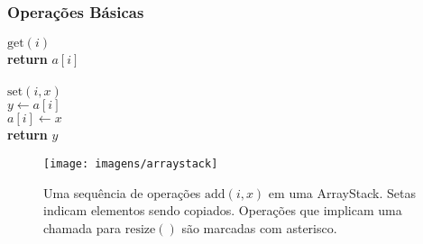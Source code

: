 \documentclass{beamer}
\begin{document}
\begin{frame}
\frametitle{Operações Básicas}
\begin{oframed}
\begin{flushleft}
\hspace*{1em} $\ensuremath{\mathrm{get}(\ensuremath{\mathit{i}})}$\\

\hspace*{1em} \hspace*{1em} {\color{black} \textbf{return}} $\ensuremath{\ensuremath{\mathit{a}}[\ensuremath{\mathit{i}}]}$\\
\ \\
\hspace*{1em} $\ensuremath{\mathrm{set}(\ensuremath{\mathit{i}}, \ensuremath{\mathit{x}})}$\\

\hspace*{1em} \hspace*{1em} $\ensuremath{\ensuremath{\mathit{y}} \gets  \ensuremath{\ensuremath{\mathit{a}}[\ensuremath{\mathit{i}}]}}$\\
\hspace*{1em} \hspace*{1em} $\ensuremath{\ensuremath{\mathit{a}}[\ensuremath{i}] \gets  \ensuremath{x}}$\\
\hspace*{1em} \hspace*{1em} {\color{black} \textbf{return}} $\ensuremath{\ensuremath{\mathit{y}}}$\\
\end{flushleft}
\end{oframed}
\end{frame}

\begin{frame}
\begin{figure}
  \begin{center}
    \texttt{[image: imagens/arraystack]}
  \end{center}
  \caption[Adding to an ArrayStack]{Uma sequência de operações $\ensuremath{\ensuremath{\mathrm{add}(\ensuremath{\mathit{i}},\ensuremath{\mathit{x}})}}$  em uma
  ArrayStack.  Setas indicam elementos sendo copiados.  Operações que implicam uma chamada para $\ensuremath{\ensuremath{\mathrm{resize}()}}$ são marcadas com asterisco.}

\end{figure}
\end{frame}
\end{document}
